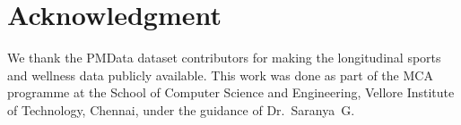 \documentclass[conference]{IEEEtran}
\begin{document}
\section*{Acknowledgment}

We thank the PMData dataset contributors for making the longitudinal sports and wellness data publicly available. This work was done as part of the MCA programme at the School of Computer Science and Engineering, Vellore Institute of Technology, Chennai, under the guidance of Dr.\ Saranya~G.



\end{document}
